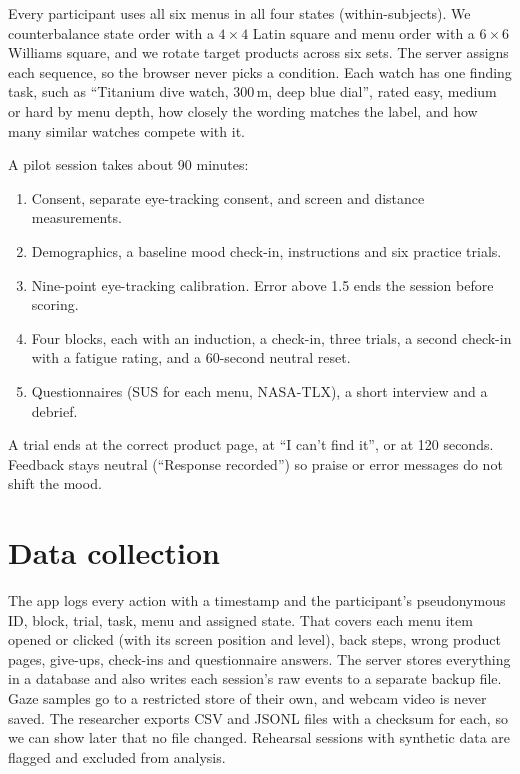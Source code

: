 \documentclass[10pt,a4paper]{article}
\begin{document}
Every participant uses all six menus in all four states (within-subjects). We counterbalance
state order with a $4\times4$ Latin square and menu order with a $6\times6$ Williams square,
and we rotate target products across six sets. The server assigns each sequence, so the
browser never picks a condition. Each watch has one finding task, such as ``Titanium dive
watch, 300\,m, deep blue dial'', rated easy, medium or hard by menu depth, how closely the
wording matches the label, and how many similar watches compete with it.

A pilot session takes about 90 minutes:
\begin{enumerate}
  \item Consent, separate eye-tracking consent, and screen and distance measurements.
  \item Demographics, a baseline mood check-in, instructions and six practice trials.
  \item Nine-point eye-tracking calibration. Error above 1.5\textdegree{} ends the session
        before scoring.
  \item Four blocks, each with an induction, a check-in, three trials, a second check-in with
        a fatigue rating, and a 60-second neutral reset.
  \item Questionnaires (SUS for each menu, NASA-TLX), a short interview and a debrief.
\end{enumerate}

A trial ends at the correct product page, at ``I can't find it'', or at 120 seconds. Feedback
stays neutral (``Response recorded'') so praise or error messages do not shift the mood.

\section{Data collection}

The app logs every action with a timestamp and the participant's pseudonymous ID, block,
trial, task, menu and assigned state. That covers each menu item opened or clicked (with
its screen position and level), back steps, wrong product pages, give-ups, check-ins and
questionnaire answers. The server stores everything in a database and also writes each
session's raw events to a separate backup file. Gaze samples go to a restricted store of
their own, and webcam video is never saved. The researcher exports CSV and JSONL files with
a checksum for each, so we can show later that no file changed. Rehearsal sessions with
synthetic data are flagged and excluded from analysis.
\end{document}

